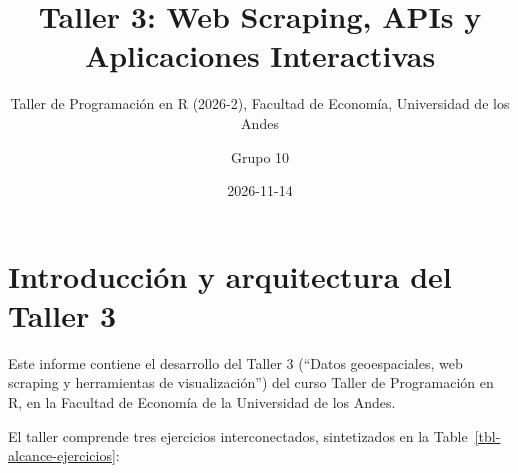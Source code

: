 \documentclass[
  10pt,
  letterpaper,
  DIV=11,
  numbers=noendperiod]{scrartcl}
\title{Taller 3: Web Scraping, APIs y Aplicaciones Interactivas}
\subtitle{Taller de Programación en R (2026-2), Facultad de Economía,
Universidad de los Andes}
\author{Grupo 10}
\date{2026-11-14}
\renewcommand*\contentsname{Table of contents}
\newcommand\contentsname{Table of contents}
\begin{document}
\maketitle

\renewcommand*\contentsname{Índice de contenido}
{
\hypersetup{linkcolor=}
\setcounter{tocdepth}{2}
\tableofcontents
}

\section{Introducción y arquitectura del Taller
3}\label{introducciuxf3n-y-arquitectura-del-taller-3}

Este informe contiene el desarrollo del Taller 3 (``Datos geoespaciales,
web scraping y herramientas de visualización'') del curso Taller de
Programación en R, en la Facultad de Economía de la Universidad de los
Andes.

El taller comprende tres ejercicios interconectados, sintetizados en la
Table~\ref{tbl-alcance-ejercicios}:
\end{document}
